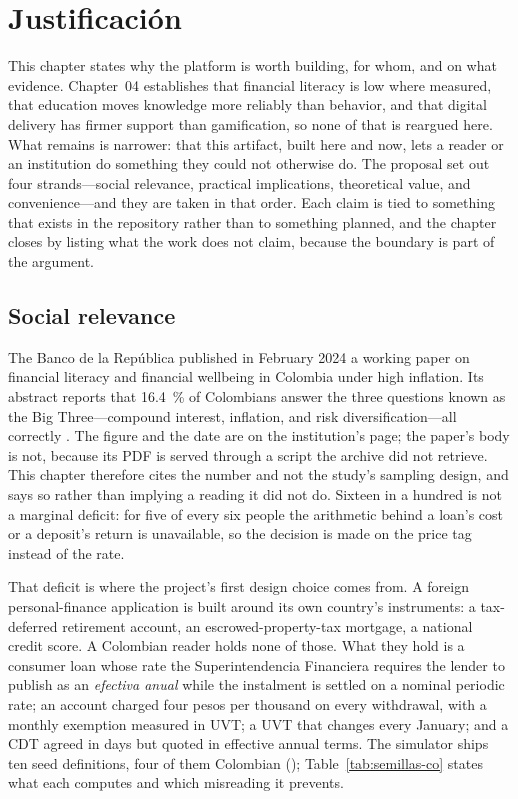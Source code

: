 \section{Justificación}

This chapter states why the platform is worth building, for whom, and on what
evidence. Chapter~04 establishes that financial literacy is low where measured, that
education moves knowledge more reliably than behavior, and that digital delivery
has firmer support than gamification, so none of that is reargued here. What
remains is narrower: that this artifact, built here and now, lets a reader or an
institution do something they could not otherwise do. The proposal set out four
strands---social relevance, practical implications, theoretical value, and
convenience---and they are taken in that order. Each claim is tied to something
that exists in the repository rather than to something planned, and the chapter
closes by listing what the work does not claim, because the boundary is part of
the argument.

\subsection{Social relevance}

The Banco de la República published in February 2024 a working paper on
financial literacy and financial wellbeing in Colombia under high inflation. Its
abstract reports that 16.4~\% of Colombians answer the three questions known as
the Big Three---compound interest, inflation, and risk diversification---all
correctly \parencite{banrep2024financial}. The figure and the date are on the
institution's page; the paper's body is not, because its PDF is served through a
script the archive did not retrieve. This chapter therefore cites the number
and not the study's sampling design, and says so rather than implying a reading
it did not do. Sixteen in a hundred is not a marginal deficit: for five of every
six people the arithmetic behind a loan's cost or a deposit's return is
unavailable, so the decision is made on the price tag instead of the rate.

That deficit is where the project's first design choice comes from. A foreign
personal-finance application is built around its own country's instruments: a
tax-deferred retirement account, an escrowed-property-tax mortgage, a national
credit score. A Colombian reader holds none of those. What they hold is a
consumer loan whose rate the Superintendencia Financiera requires the lender to
publish as an \emph{efectiva anual} while the instalment is settled on a nominal
periodic rate; an account charged four pesos per thousand on every withdrawal,
with a monthly exemption measured in UVT; a UVT that changes every January; and
a CDT agreed in days but quoted in effective annual terms. The simulator ships
ten seed definitions, four of them Colombian
();
Table~\ref{tab:semillas-co} states what each computes and which misreading it
prevents.

